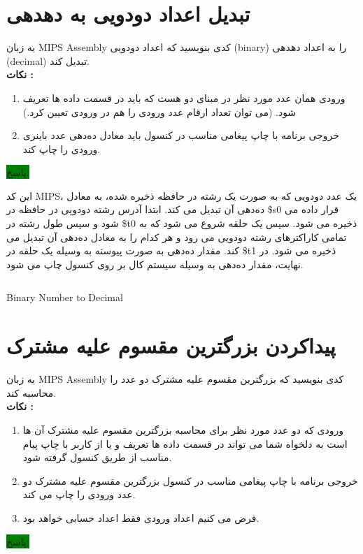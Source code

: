 \section{تبدیل اعداد دودویی به دهدهی}
{به زبان MIPS Assembly کدی بنویسید که اعداد دودویی (binary) را به اعداد دهدهی (decimal) تبدیل کند.}\\
\bf {نکات :}
\normalfont
\begin{enumerate}
    \item {ورودی همان عدد مورد نظر در مبنای دو هست که باید در قسمت داده ها  تعریف شود. (می توان تعداد ارقام عدد ورودی را هم در ورودی تعیین کرد.)}
    \item {خروجی برنامه با چاپ پیغامی مناسب در کنسول باید معادل ده‌دهی عدد باینری ورودی را چاپ کند.}
\end{enumerate}
\colorbox{green}{پاسخ:}\\
\normalfont

{این کد MIPS، یک عدد دودویی که به صورت یک رشته در حافظه ذخیره شده، به معادل ده‌دهی آن تبدیل می کند.
ابتدا آدرس رشته دودویی در حافظه در \$s0 قرار داده می شود و سپس طول رشته در \$t0 ذخیره می شود.
سپس یک حلقه شروع می شود که به تمامی کاراکترهای رشته دودویی می رود و هر کدام را به معادل ده‌دهی آن تبدیل می کند.
مقدار ده‌دهی به صورت پیوسته به وسیله یک حلقه در \$t1 ذخیره می شود.
در نهایت، مقدار ده‌دهی به وسیله سیستم کال بر روی کنسول چاپ می شود.}

\begin{latin}
\begin{listing}[ht]
    \inputminted[linenos=true]{asm}{sources/Binary_Number_to_Decimal.mips}
    \caption{Binary Number to Decimal}
    \label{listing:}
\end{listing}
\end{latin}


\clearpage    
\section{پیداکردن بزرگترین مقسوم علیه مشترک}
{به زبان MIPS Assembly کدی بنویسید که بزرگترین مقسوم علیه مشترک دو عدد را محاسبه کند.}\\
\bf {نکات :}
\normalfont
\begin{enumerate}
    \item {ورودی که دو عدد مورد نظر برای محاسبه بزرگترین مقسوم علیه مشترک آن ها است به دلخواه شما می تواند در قسمت داده ها  تعریف و یا از کاربر با چاپ پیام مناسب از طریق کنسول گرفته شود.}
    \item {خروجی برنامه با چاپ پیغامی مناسب در کنسول بزرگترین مقسوم علیه مشترک دو عدد ورودی را چاپ می کند.}
    \item {فرض می کنیم اعداد ورودی فقط اعداد حسابی خواهد بود.}
\end{enumerate}
\colorbox{green}{پاسخ:}\\
\normalfont

